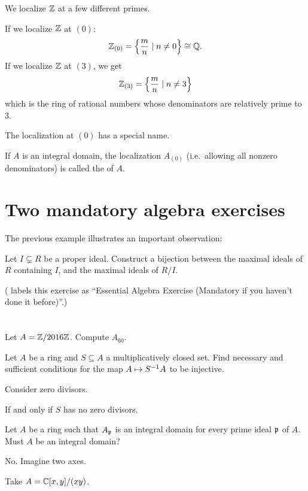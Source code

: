 \begin{example}
	We localize $\mathbb Z$ at a few different primes.
	\begin{enumerate}[(a)]
		\ii If we localize $\mathbb Z$ at $(0)$:
		\[ \mathbb Z_{(0)} = \left\{ \frac mn \mid n \ne 0 \right\}
			\cong \mathbb Q. \]
		\ii If we localize $\mathbb Z$ at $(3)$, we get
		\[ \mathbb Z_{(3)} = \left\{ \frac mn \mid n \ne 3 \right\} \]
		which is the ring of rational numbers
		whose denominators are relatively prime to $3$.
	\end{enumerate}
\end{example}

The localization at $(0)$ has a special name.
\begin{definition}
	If $A$ is an integral domain,
	the localization $A_{(0)}$ (i.e.\ allowing all nonzero denominators)
	is called the  of $A$.
\end{definition}


\section{Two mandatory algebra exercises}
The previous example illustrates an important observation:
\begin{exercise}
	Let $I \subsetneq R$ be a proper ideal.
	Construct a bijection between the maximal ideals of $R$ containing $I$,
	and the maximal ideals of $R/I$.
\end{exercise}
(\cite{ref:vakil} labels this exercise as
``Essential Algebra Exercise (Mandatory if you haven't done it before)''.)


\section{\problemhead}

\begin{problem}
	Let $A = \mathbb Z/2016\mathbb Z$. Compute $A_{60}$.
\end{problem}

\begin{problem}
	Let $A$ be a ring and $S \subseteq A$ a multiplicatively closed set.
	Find necessary and sufficient conditions
	for the map $A \mapsto S^{-1} A$ to be injective.
	\begin{hint}
		Consider zero divisors.
	\end{hint}
	\begin{sol}
		If and only if $S$ has no zero divisors.
	\end{sol}
\end{problem}

\begin{problem}
	Let $A$ be a ring such that $A_\mathfrak p$ is an integral domain
	for every prime ideal $\mathfrak p$ of $A$.
	Must $A$ be an integral domain?
	\begin{hint}
		No. Imagine two axes.
	\end{hint}
	\begin{sol}
		Take $A = \mathbb C[x,y] / (xy)$.
	\end{sol}
\end{problem}
